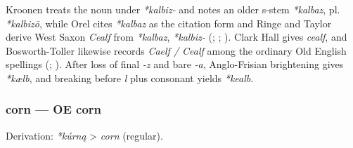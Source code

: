 \documentclass[
  british,
  a4paper,
]{article}
\begin{document}
Kroonen treats the noun under \emph{*kalbiz-} and notes an older s-stem
\emph{*kalbaz}, pl. \emph{*kalbizō}, while Orel cites \emph{*kalbaz} as
the citation form and Ringe and Taylor derive West Saxon \emph{Cealf}
from \emph{*kalbaz}, \emph{*kalbiz-} (; ;
). Clark Hall
gives \emph{cealf}, and Bosworth-Toller likewise records \emph{Caelf /
Cealf} among the ordinary Old English spellings
(;
). After
loss of final \emph{-z} and bare \emph{-a}, Anglo-Frisian brightening
gives \emph{*kælb}, and breaking before \emph{l} plus consonant yields
\emph{*kealb}.

\subsubsection{corn --- OE corn}\label{corn-oe-corn}

Derivation: \emph{*kúrną} \textgreater{} \emph{corn} (regular).

\begingroup
\setlength{\fboxsep}{6pt}
\end{document}
